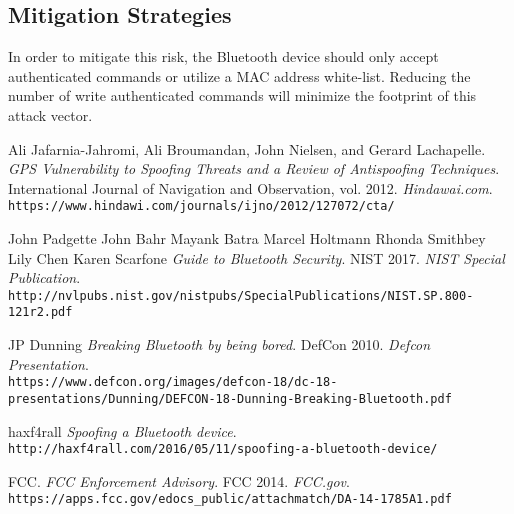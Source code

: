 \documentclass{article}
\begin{document}
\subsection{Mitigation Strategies}
In order to mitigate this risk, the Bluetooth device should only accept authenticated commands or utilize a MAC address white-list. Reducing the number of write authenticated commands will minimize the footprint of this attack vector. 


\begin{thebibliography}{9}

Ali Jafarnia-Jahromi, Ali Broumandan, John Nielsen, and Gerard Lachapelle.
\textit{GPS Vulnerability to Spoofing Threats and a Review of Antispoofing Techniques}.
International Journal of Navigation and Observation, vol. 2012.
\textit{Hindawai.com}.
\\\texttt{https://www.hindawi.com/journals/ijno/2012/127072/cta/}

John Padgette John Bahr Mayank Batra Marcel Holtmann Rhonda Smithbey Lily Chen Karen Scarfone
\textit{Guide to Bluetooth Security}.
NIST 2017.
\textit{NIST Special Publication}.
\\\texttt{http://nvlpubs.nist.gov/nistpubs/SpecialPublications/NIST.SP.800-121r2.pdf}

JP Dunning
\textit{Breaking Bluetooth by being bored}.
DefCon 2010.
\textit{Defcon Presentation}.
\\\texttt{https://www.defcon.org/images/defcon-18/dc-18-presentations\-/Dunning/DEFCON-18-Dunning-Breaking-Bluetooth.pdf}

haxf4rall
\textit{Spoofing a Bluetooth device}.
\\\texttt{http://haxf4rall.com/2016/05/11/spoofing-a-bluetooth-device/}

FCC.
\textit{FCC Enforcement Advisory}.
FCC 2014.
\textit{FCC.gov}.
\\\texttt{https://apps.fcc.gov/edocs\_public/attachmatch/DA-14-1785A1.pdf}


\end{thebibliography}
\printglossaries

\end{document}
